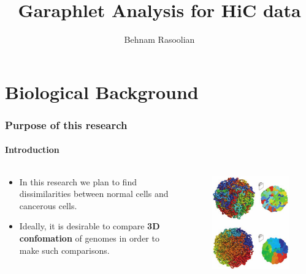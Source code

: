 \documentclass{beamer}
\title{Garaphlet Analysis for HiC data}
\author{Behnam Rasoolian}
\institute{Auburn University}
\date{}
\begin{document}
\frame{\titlepage}
\section{Biological Background}
\begin{frame}[t]
    \frametitle{Purpose of this research}
    \framesubtitle{Introduction}
    \begin{columns}
        \begin{column}{.5\textwidth}
            \begin{itemize}
                \item In this research we plan to find dissimilarities 
                    between normal cells and cancerous cells.
                \item Ideally, it is desirable to compare \textbf{3D confomation}
                    of genomes in order to make such comparisons.
            \end{itemize}
        \end{column}
        \begin{column}[c]{.5\textwidth}
            \begin{figure}
                \includegraphics[width=.6\textwidth]{figures/chromosome_3d_structure.png}
                \caption*{ \cite{lieberman2009comprehensive}}
            \end{figure}
        \end{column}
    \end{columns}
\end{frame}
\end{document}
